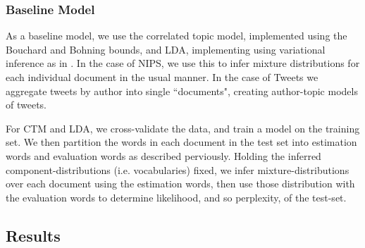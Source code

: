 

\subsubsection{Baseline Model}
As a baseline model, we use the correlated topic model, implemented using the Bouchard and Bohning bounds, and LDA, implementing using variational inference as in \cite{BleiNgJordan2003}. In the case of NIPS, we use this to infer mixture distributions for each individual document in the usual manner. In the case of Tweets we aggregate tweets by author into single ``documents", creating author-topic models of tweets.

For CTM and LDA, we cross-validate the data, and train a model on the training set. We then partition the words in each document in the test set into estimation words and evaluation words as described perviously. Holding the inferred component-distributions (i.e. vocabularies) fixed, we infer mixture-distributions over each document using the estimation words, then use those distribution with the evaluation words to determine likelihood, and so perplexity, of the test-set.


\subsection{Results}
